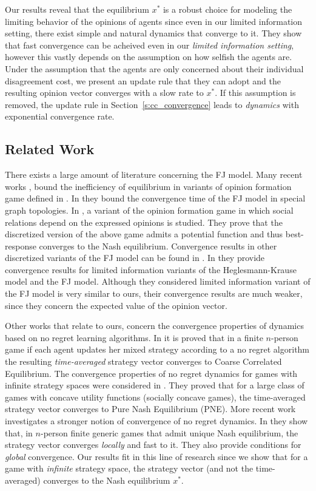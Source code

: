 Our results reveal that the equilibrium $x^*$ is a robust choice for modeling
the limiting behavior of the opinions of agents since even in our limited
information setting, there exist simple and natural dynamics that converge to it.
They show that fast convergence can be acheived even in
our \emph{limited information setting}, however this vastly depends on
the assumption on how selfish the agents are. Under the assumption that
the agents are only concerned about their individual disagreement cost, 
we present an update rule that they can adopt and the resulting opinion 
vector converges with a slow rate to $x^*$. If this assumption is removed,
the update rule in Section~\ref{s:cc_convergence} leads to \emph{dynamics}
with exponential convergence rate.



\subsection{Related Work}

There exists a large amount of literature concerning the FJ model.  Many recent
works \cite{BGM13,CKO13}, \cite{BFM16,EFHS17} bound the inefficiency of
equilibrium in variants of opinion formation game defined in \cite{BKO11}. In
\cite{GS14} they bound the convergence time of the FJ model in special graph
topologies.  In \cite{BFM16}, a variant of the opinion formation game in which
social relations depend on the expressed opinions is studied.  They prove that
the discretized version of the above game admits a potential function and thus
best-response converges to the Nash equilibrium.  Convergence results in other
discretized variants of the FJ model can be found in \cite{YOASS13,FGV16}. In
\cite{FPS16} they provide convergence results for limited information variants
of the Heglesmann-Krause model \cite{HK} and the FJ model. Although they
considered limited information variant of the FJ model is very similar to ours,
their convergence results are much weaker, since they concern the expected
value of the opinion vector.

Other works that relate to ours, concern the convergence properties of dynamics
based on no regret learning algorithms.  In \cite{FV97,FS99,SA00,SALS15} it is
proved that in a finite $n$-person game if each agent updates her mixed
strategy according to a no regret algorithm the resulting \emph{time-averaged}
strategy vector converges to Coarse Correlated Equilibrium. The convergence
properties of no regret dynamics for games with infinite strategy spaces were
considered in \cite{EMN09}.  They proved that for a large class of games with
concave utility functions (socially concave games), the time-averaged strategy
vector converges to Pure Nash Equilibrium (PNE). More recent work investigates
a stronger notion of convergence of no regret dynamics. In \cite{CHM17} they
show that, in $n$-person finite generic games that admit unique Nash
equilibrium, the strategy vector converges \emph{locally} and fast to it.  They
also provide conditions for \emph{global} convergence.  Our results fit in this
line of research since we show that for a game with \emph{infinite} strategy
space, the strategy vector (and not the time-averaged) converges to the Nash
equilibrium $x^*$.

